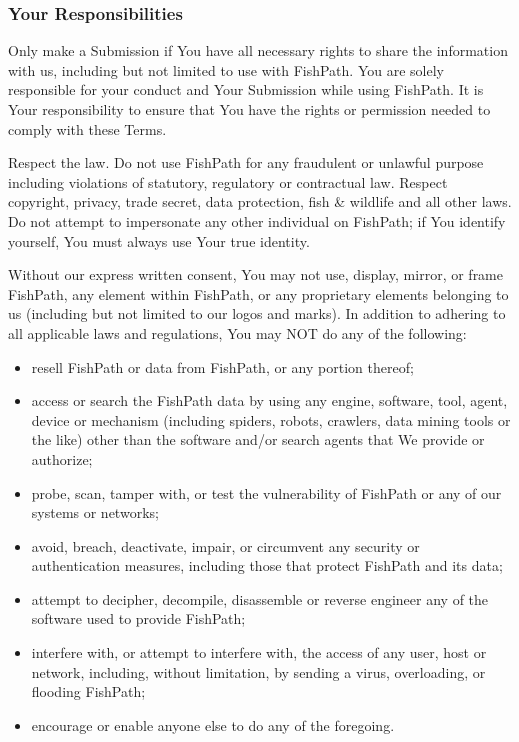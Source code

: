 \documentclass[
  11pt,
]{book}
\providecommand{\tightlist}{%
  \setlength{\itemsep}{0pt}\setlength{\parskip}{0pt}}
\begin{document}
\hypertarget{your-responsibilities}{%
\subsubsection*{Your Responsibilities}\label{your-responsibilities}}

Only make a Submission if You have all necessary rights to share the information with us, including but not limited to use with FishPath. You are solely responsible for your conduct and Your Submission while using FishPath. It is Your responsibility to ensure that You have the rights or permission needed to comply with these Terms.

Respect the law. Do not use FishPath for any fraudulent or unlawful purpose including violations of statutory, regulatory or contractual law. Respect copyright, privacy, trade secret, data protection, fish \& wildlife and all other laws. Do not attempt to impersonate any other individual on FishPath; if You identify yourself, You must always use Your true identity.

Without our express written consent, You may not use, display, mirror, or frame FishPath, any element within FishPath, or any proprietary elements belonging to us (including but not limited to our logos and marks). In addition to adhering to all applicable laws and regulations, You may NOT do any of the following:

\begin{itemize}
\tightlist
\item
  resell FishPath or data from FishPath, or any portion thereof;
\item
  access or search the FishPath data by using any engine, software, tool, agent, device or mechanism (including spiders, robots, crawlers, data mining tools or the like) other than the software and/or search agents that We provide or authorize;
\item
  probe, scan, tamper with, or test the vulnerability of FishPath or any of our systems or networks;
\item
  avoid, breach, deactivate, impair, or circumvent any security or authentication measures, including those that protect FishPath and its data;
\item
  attempt to decipher, decompile, disassemble or reverse engineer any of the software used to provide FishPath;
\item
  interfere with, or attempt to interfere with, the access of any user, host or network, including, without limitation, by sending a virus, overloading, or flooding FishPath;
\item
  encourage or enable anyone else to do any of the foregoing.
\end{itemize}
\end{document}
